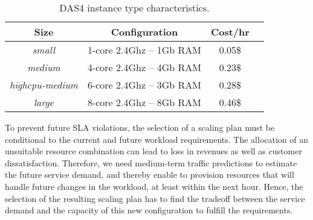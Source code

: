 \begin{table}[t]
  {\scriptsize 
\begin{center}
    \begin{tabular}{  | c | c | c | c | }
    \hline
       \textbf{Size}  & \textbf{Configuration} & \textbf{Cost/hr} \\ \hline
   \textit{small}   & 1-core 2.4Ghz -- 1Gb RAM&  0.05\$ \\ \hline
   \textit{medium}   & 4-core 2.4Ghz  -- 4Gb RAM&  0.23\$ \\ \hline
\textit{highcpu-medium} & 6-core 2.4Ghz -- 3Gb RAM& 0.28\$   \\ \hline
\textit{large} & 8-core 2.4Ghz  -- 8Gb RAM& 0.46\$   \\ \hline

 \end{tabular}
\end{center}
\caption{DAS4 instance type characteristics.}
\label{DAS4instances}
}
\end{table}

To prevent future SLA violations, the selection of a scaling plan must be conditional to the current and future workload requirements. The allocation of an unsuitable resource combination can lead to loss in revenues as well as customer dissatisfaction. Therefore, we need medium-term traffic predictions to estimate the future service demand, and thereby enable to provision resources that will handle future changes in the workload, at least within the next hour. Hence, the selection of the resulting scaling plan has to find the tradeoff between the service demand and the capacity of this new configuration to fulfill the requirements. 



